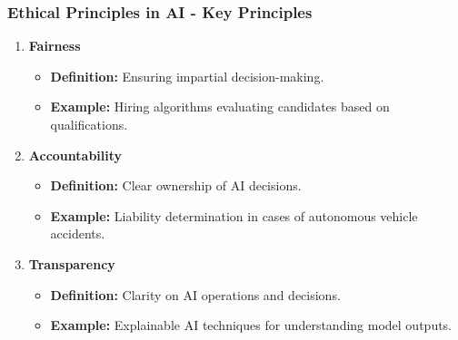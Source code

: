 \documentclass{beamer}
\begin{document}
\begin{frame}[fragile]
    \frametitle{Ethical Principles in AI - Key Principles}
    \begin{enumerate}
        \item \textbf{Fairness}
            \begin{itemize}
                \item \textbf{Definition:} Ensuring impartial decision-making.
                \item \textbf{Example:} Hiring algorithms evaluating candidates based on qualifications.
            \end{itemize}
        \item \textbf{Accountability}
            \begin{itemize}
                \item \textbf{Definition:} Clear ownership of AI decisions.
                \item \textbf{Example:} Liability determination in cases of autonomous vehicle accidents.
            \end{itemize}
        \item \textbf{Transparency}
            \begin{itemize}
                \item \textbf{Definition:} Clarity on AI operations and decisions.
                \item \textbf{Example:} Explainable AI techniques for understanding model outputs.
            \end{itemize}
    \end{enumerate}
\end{frame}
\end{document}
